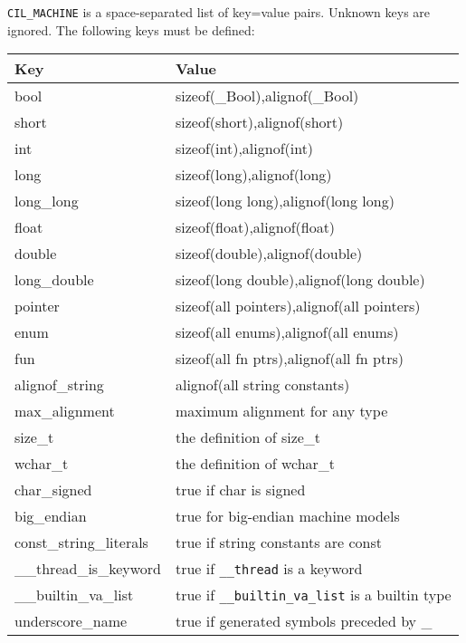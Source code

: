 \documentclass[letterpaper]{article}
\def\t#1{{\tt #1}}
\begin{document}
\t{CIL\_MACHINE} is a space-separated list of key=value pairs. Unknown
keys are ignored. The following keys must be defined:
\begin{center}
  \begin{tabular}{|l|l|} \hline
    Key & Value \\ \hline
    bool            & sizeof(\_Bool),alignof(\_Bool) \\
    short           & sizeof(short),alignof(short) \\
    int             & sizeof(int),alignof(int) \\
    long            & sizeof(long),alignof(long) \\
    long\_long      & sizeof(long long),alignof(long long) \\
    float           & sizeof(float),alignof(float) \\
    double          & sizeof(double),alignof(double) \\
    long\_double    & sizeof(long double),alignof(long double) \\
    pointer         & sizeof(all pointers),alignof(all pointers) \\
    enum            & sizeof(all enums),alignof(all enums) \\
    fun             & sizeof(all fn ptrs),alignof(all fn ptrs) \\
    alignof\_string & alignof(all string constants) \\
    max\_alignment  & maximum alignment for any type \\
    size\_t         & the definition of size\_t \\
    wchar\_t        & the definition of wchar\_t \\
    char\_signed    & true if char is signed \\
    big\_endian     & true for big-endian machine models \\
    const\_string\_literals & true if string constants are const \\
    \_\_thread\_is\_keyword & true if \t{\_\_thread} is a keyword \\
    \_\_builtin\_va\_list & true if \t{\_\_builtin\_va\_list} is a builtin type \\
    underscore\_name & true if generated symbols preceded by \_ \\ \hline
  \end{tabular}
\end{center}
\end{document}
